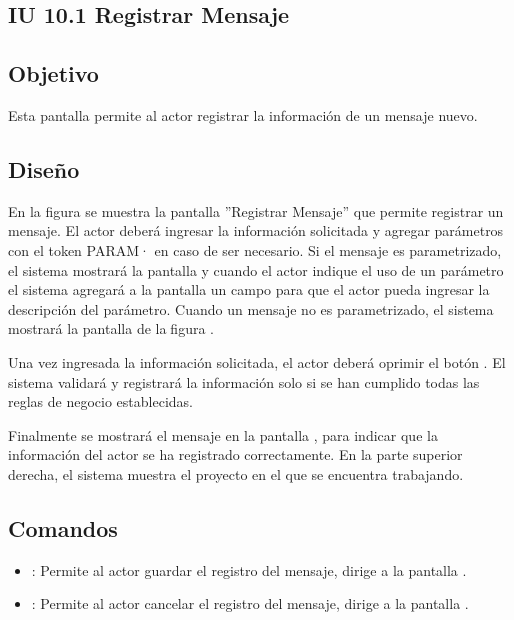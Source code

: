 \subsection{IU 10.1 Registrar Mensaje}

\subsection{Objetivo}
	Esta pantalla permite al actor registrar la información de un mensaje nuevo.
\subsection{Diseño}
	En la figura  se muestra la pantalla ''Registrar Mensaje'' que permite registrar un mensaje.
	El actor deberá ingresar la información solicitada y agregar parámetros con el token PARAM· en caso de ser necesario. Si el mensaje es parametrizado, el sistema mostrará la pantalla  y cuando el actor indique el uso de un parámetro el sistema agregará a la pantalla un campo para que el actor pueda ingresar la descripción del parámetro. Cuando un mensaje no es parametrizado, el sistema mostrará la pantalla de lafigura .
	
	Una vez ingresada la información solicitada, el actor deberá oprimir el botón  . El sistema validará y registrará la información solo si se han cumplido todas las reglas de negocio establecidas.
	
	Finalmente se mostrará el mensaje  en la pantalla , para indicar que la información del actor se ha registrado correctamente.
	En la parte superior derecha, el sistema muestra el proyecto en el que se encuentra trabajando.

\subsection{Comandos}
\begin{itemize}
	\item {}: Permite al actor guardar el registro del mensaje, dirige a la pantalla .
	\item {}: Permite al actor cancelar el registro del mensaje, dirige a la pantalla .
\end{itemize}

